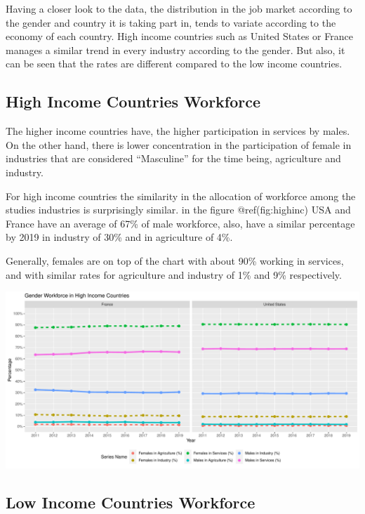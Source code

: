 \documentclass[
]{article}
\begin{document}
Having a closer look to the data, the distribution in the job market
according to the gender and country it is taking part in, tends to
variate according to the economy of each country. High income countries
such as United States or France manages a similar trend in every
industry according to the gender. But also, it can be seen that the
rates are different compared to the low income countries.
\autocite{femaleworkforce}

\hypertarget{high-income-countries-workforce}{%
\subsection{High Income Countries
Workforce}\label{high-income-countries-workforce}}

The higher income countries have, the higher participation in services
by males. On the other hand, there is lower concentration in the
participation of female in industries that are considered ``Masculine''
for the time being, agriculture and industry.

For high income countries the similarity in the allocation of workforce
among the studies industries is surprisingly similar. in the figure
@ref(fig:highinc) USA and France have an average of 67\% of male
workforce, also, have a similar percentage by 2019 in industry of 30\%
and in agriculture of 4\%.

Generally, females are on top of the chart with about 90\% working in
services, and with similar rates for agriculture and industry of 1\% and
9\% respectively.

\includegraphics{The_Outsiders_5513_files/figure-latex/highinc-1.pdf}

\hypertarget{low-income-countries-workforce}{%
\subsection{Low Income Countries
Workforce}\label{low-income-countries-workforce}}
\end{document}
